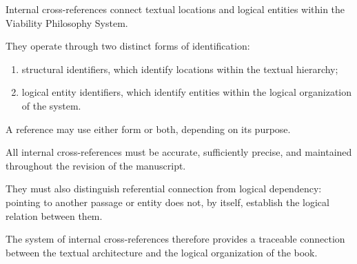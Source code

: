 Internal cross-references connect
textual locations and logical
entities within the Viability
Philosophy System.

They operate through two distinct
forms of identification:

\begin{enumerate}
    \item structural identifiers,
    which identify locations within
    the textual hierarchy;

    \item logical entity identifiers,
    which identify entities within
    the logical organization
    of the system.
\end{enumerate}

A reference may use either form
or both, depending on its purpose.

All internal cross-references
must be accurate, sufficiently
precise, and maintained throughout
the revision of the manuscript.

They must also distinguish
referential connection from
logical dependency: pointing
to another passage or entity
does not, by itself, establish
the logical relation between them.

The system of internal
cross-references therefore
provides a traceable connection
between the textual architecture
and the logical organization
of the book.

\cleardoublepage

